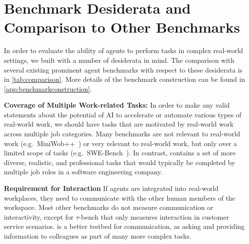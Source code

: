 \documentclass{article}
\begin{document}


\section{Benchmark Desiderata and Comparison to Other Benchmarks}
\label{sec:existing_benchmarks}

In order to evaluate the ability of agents to perform tasks in complex real-world settings, we built \tac with a number of desiderata in mind.
The comparison with several existing prominent agent benchmarks with respect to these desiderata is in \autoref{tab:comparison}. More details of the benchmark construction can be found in \autoref{app:benchmarkconstruction}.

\noindent \textbf{Coverage of Multiple Work-related Tasks:} \quad In order to make any valid statements about the potential of AI to accelerate or automate various types of real-world work, we should have tasks that are motivated by real-world work across multiple job categories. Many benchmarks are not relevant to real-world work (e.g.~MiniWob++~\citep{liu2018reinforcement}) or very relevant to real-world work, but only over a limited scope of tasks (e.g.~SWE-Bench~\citep{jimenez2024swebench}).
In contrast, \tac contains a set of more diverse, realistic, and professional tasks that would typically be completed by multiple job roles in a software engineering company.

\noindent \textbf{Requirement for Interaction} \quad If agents are integrated into real-world workplaces, they need to communicate with the other human members of the workspace.
Most other benchmarks do not measure communication or interactivity, except for $\tau$-bench \citep{yao2024tau} that only measures interaction in customer service scenarios.
\tac is a better testbed for communication, as asking and providing information to colleagues as part of many more complex tasks.
\end{document}
